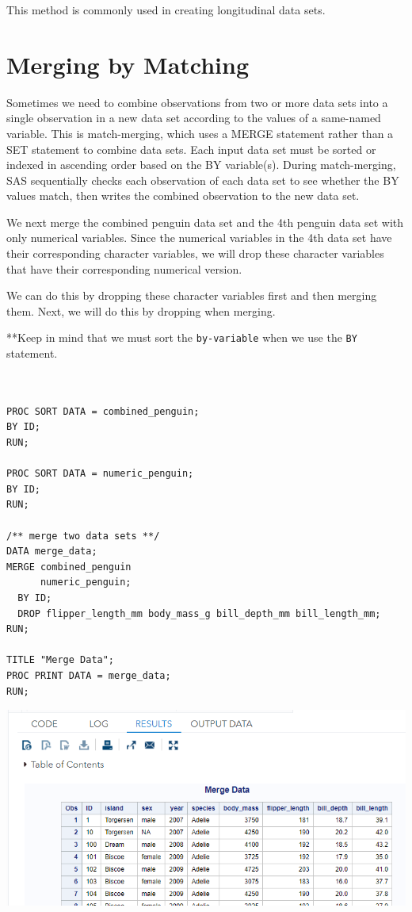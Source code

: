 \documentclass[
]{book}
\begin{document}
This method is commonly used in creating longitudinal data sets.

\hypertarget{merging-by-matching}{%
\section{Merging by Matching}\label{merging-by-matching}}

Sometimes we need to combine observations from two or more data sets into a
single observation in a new data set according to the values of a same-named
variable. This is match-merging, which uses a MERGE statement rather than a
SET statement to combine data sets. Each input data set must be sorted or
indexed in ascending order based on the BY variable(s). During match-merging,
SAS sequentially checks each observation of each data set to see whether
the BY values match, then writes the combined observation to the new data set.

We next merge the combined penguin data set and the 4th penguin data set with only numerical variables. Since the numerical variables in the 4th data set have their corresponding character variables, we will drop these character variables that have their corresponding numerical version.

We can do this by dropping these character variables first and then merging them. Next, we will do this by dropping when merging.

**Keep in mind that we must sort the \texttt{by-variable} when we use the \texttt{BY} statement.

\begin{verbatim}


PROC SORT DATA = combined_penguin;
BY ID;
RUN;

PROC SORT DATA = numeric_penguin;
BY ID;
RUN;

/** merge two data sets **/
DATA merge_data;
MERGE combined_penguin
      numeric_penguin;
  BY ID;
  DROP flipper_length_mm body_mass_g bill_depth_mm bill_length_mm;
RUN;

TITLE "Merge Data";
PROC PRINT DATA = merge_data;
RUN;
\end{verbatim}

\begin{center}\includegraphics[width=1\linewidth]{img08/w08-MergeData} \end{center}
\end{document}
